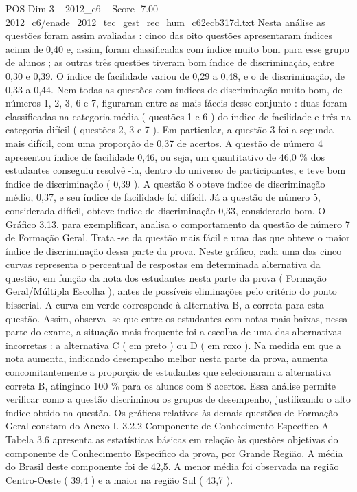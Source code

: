 \begin{textsample}{POS Dim 3 – 2012\_c6 – Score -7.00 – 2012\_c6/enade\_2012\_tec\_gest\_rec\_hum\_c62ecb317d.txt}
Nesta análise as questões foram assim avaliadas : cinco das oito questões apresentaram índices acima de 0,40 e, assim, foram classificadas com índice muito bom para esse grupo de alunos ; as outras três questões tiveram bom índice de discriminação, entre 0,30 e 0,39.
O índice de facilidade variou de 0,29 a 0,48, e o de discriminação, de 0,33 a 0,44.
Nem todas as questões com índices de discriminação muito bom, de números 1, 2, 3, 6 e 7, figuraram entre as mais fáceis desse conjunto : duas foram classificadas na categoria média ( questões 1 e 6 ) do índice de facilidade e três na categoria difícil ( questões 2, 3 e 7 ).
Em particular, a questão 3 foi a segunda mais difícil, com uma proporção de 0,37 de acertos.
A questão de número 4 apresentou índice de facilidade 0,46, ou seja, um quantitativo de 46,0 \% dos estudantes conseguiu resolvê -la, dentro do universo de participantes, e teve bom índice de discriminação ( 0,39 ).
A questão 8 obteve índice de discriminação médio, 0,37, e seu índice de facilidade foi difícil.
Já a questão de número 5, considerada difícil, obteve índice de discriminação 0,33, considerado bom.
O Gráfico 3.13, para exemplificar, analisa o comportamento da questão de número 7 de Formação Geral.
Trata -se da questão mais fácil e uma das que obteve o maior índice de discriminação dessa parte da prova.
Neste gráfico, cada uma das cinco curvas representa o percentual de respostas em determinada alternativa da questão, em função da nota dos estudantes nesta parte da prova ( Formação Geral/Múltipla Escolha ), antes de possíveis eliminações pelo critério do ponto bisserial.
A curva em verde corresponde à alternativa B, a correta para esta questão.
Assim, observa -se que entre os estudantes com notas mais baixas, nessa parte do exame, a situação mais frequente foi a escolha de uma das alternativas incorretas : a alternativa C ( em preto ) ou D ( em roxo ).
Na medida em que a nota aumenta, indicando desempenho melhor nesta parte da prova, aumenta concomitantemente a proporção de estudantes que selecionaram a alternativa correta B, atingindo 100 \% para os alunos com 8 acertos.
Essa análise permite verificar como a questão discriminou os grupos de desempenho, justificando o alto índice obtido na questão.
Os gráficos relativos às demais questões de Formação Geral constam do Anexo I. 3.2.2 Componente de Conhecimento Específico A Tabela 3.6 apresenta as estatísticas básicas em relação às questões objetivas do componente de Conhecimento Específico da prova, por Grande Região.
A média do Brasil deste componente foi de 42,5.
A menor média foi observada na região Centro-Oeste ( 39,4 ) e a maior na região Sul ( 43,7 ).

\end{textsample}
